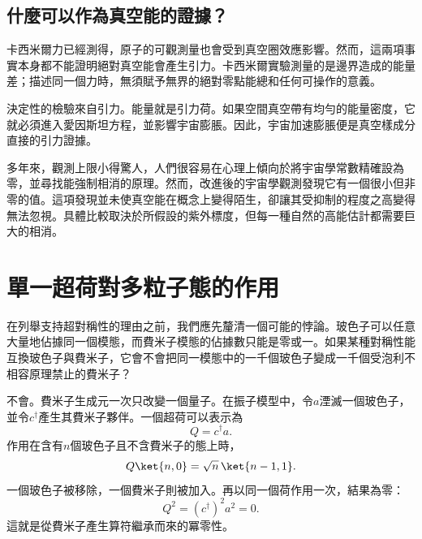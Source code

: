 \begin{classroomqa}
\end{classroomqa}

\subsection{什麼可以作為真空能的證據？}

卡西米爾力已經測得，原子的可觀測量也會受到真空圈效應影響。然而，這兩項事實本身都不能證明絕對真空能會產生引力。卡西米爾實驗測量的是邊界造成的能量差；描述同一個力時，無須賦予無界的絕對零點能總和任何可操作的意義。

決定性的檢驗來自引力。能量就是引力荷。如果空間真空帶有均勻的能量密度，它就必須進入愛因斯坦方程，並影響宇宙膨脹。因此，宇宙加速膨脹便是真空樣成分直接的引力證據。

\begin{classroomqa}
\end{classroomqa}

多年來，觀測上限小得驚人，人們很容易在心理上傾向於將宇宙學常數精確設為零，並尋找能強制相消的原理。然而，改進後的宇宙學觀測發現它有一個很小但非零的值。這項發現並未使真空能在概念上變得陌生，卻讓其受抑制的程度之高變得無法忽視。具體比較取決於所假設的紫外標度，但每一種自然的高能估計都需要巨大的相消。

\section{單一超荷對多粒子態的作用}

在列舉支持超對稱性的理由之前，我們應先釐清一個可能的悖論。玻色子可以任意大量地佔據同一個模態，而費米子模態的佔據數只能是零或一。如果某種對稱性能互換玻色子與費米子，它會不會把同一模態中的一千個玻色子變成一千個受泡利不相容原理禁止的費米子？

不會。費米子生成元一次只改變一個量子。在振子模型中，令\(a\)湮滅一個玻色子，並令\(c^\dagger\)產生其費米子夥伴。一個超荷可以表示為
\begin{equation}
Q=c^\dagger a.
\end{equation}
作用在含有\(n\)個玻色子且不含費米子的態上時，
\begin{equation}
Q\ket{n,0}
=\sqrt n\,\ket{n-1,1}.
\end{equation}
一個玻色子被移除，一個費米子則被加入。再以同一個荷作用一次，結果為零：
\begin{equation}
Q^2=(c^\dagger)^2a^2=0.
\end{equation}
這就是從費米子產生算符繼承而來的冪零性。

